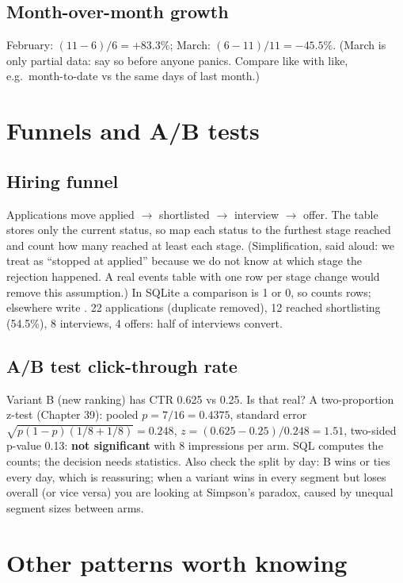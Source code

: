\subsection{Month-over-month growth}
February: $(11 - 6)/6 = +83.3\%$; March: $(6 - 11)/11 = -45.5\%$. (March is only partial data: say so before anyone panics. Compare like with like, e.g.\
month-to-date vs the same days of last month.)

\section{Funnels and A/B tests}
\subsection{Hiring funnel}
Applications move applied $\to$ shortlisted $\to$ interview $\to$ offer. The table stores only the current status, so map each status to the furthest
stage reached and count how many reached at least each stage. (Simplification, said aloud: we treat \code{rejected} as ``stopped at applied'' because we
do not know at which stage the rejection happened. A real events table with one row per stage change would remove this assumption.)
\runsql{L4_funnel}
In SQLite a comparison is 1 or 0, so  counts rows; elsewhere write . 22
applications (duplicate removed), 12 reached shortlisting (54.5\%), 8 interviews, 4 offers: half of interviews convert.

\subsection{A/B test click-through rate}
Variant B (new ranking) has CTR 0.625 vs 0.25. Is that real? A two-proportion z-test (Chapter 39): pooled $p = 7/16 = 0.4375$, standard error
$\sqrt{p(1-p)(1/8 + 1/8)} = 0.248$, $z = (0.625 - 0.25)/0.248 = 1.51$, two-sided p-value 0.13: \textbf{not significant} with 8 impressions per arm.
SQL computes the counts; the decision needs statistics. Also check the split by day:
\runsql{L4_ctr_daily}
B wins or ties every day, which is reassuring; when a variant wins in every segment but loses overall (or vice versa) you are looking at Simpson's
paradox, caused by unequal segment sizes between arms.

\section{Other patterns worth knowing}
